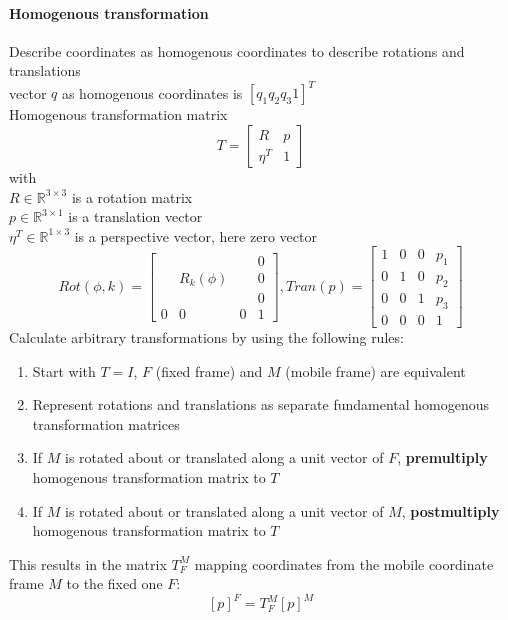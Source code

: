 \documentclass[12pt]{article}
\newcommand{\R}{\mathbb{R}}
\begin{document}
	\paragraph{Homogenous transformation} Describe coordinates as homogenous coordinates to describe rotations and translations\\
	vector $q$ as homogenous coordinates is $[q_{1} q_{2} q_{3} 1]^T$\\
	Homogenous transformation matrix
	\begin{equation}
	T = 
	\begin{bmatrix}
	R & p\\
	\eta^T & 1
	\end{bmatrix}
	\end{equation}
	with\\
	$R \in \R^{3 \times 3}$ is a rotation matrix\\
	$p \in \R^{3 \times 1}$ is a translation vector\\
	$\eta^T \in \R^{1 \times 3}$ is a perspective vector, here zero vector
	\begin{equation}
	Rot(\phi, k) = 
	\begin{bmatrix}
	& & & 0\\
	& R_{k}(\phi) & & 0\\
	& & & 0\\
	0 & 0 & 0 & 1
	\end{bmatrix}, 
	Tran(p) = 
	\begin{bmatrix}
	1 & 0 & 0 & p_{1}\\
	0 & 1 & 0 & p_{2}\\
	0 & 0 & 1 & p_{3}\\
	0 & 0 & 0 & 1
	\end{bmatrix}
	\end{equation}
	Calculate arbitrary transformations by using the following rules:
	\begin{enumerate}
		\item Start with $T = I$, $F$ (fixed frame) and $M$ (mobile frame) are equivalent
		\item Represent rotations and translations as separate fundamental homogenous transformation matrices
		\item If $M$ is rotated about or translated along a unit vector of $F$, \textbf{premultiply} homogenous transformation matrix to $T$
		\item If $M$ is rotated about or translated along a unit vector of $M$, \textbf{postmultiply} homogenous transformation matrix to $T$
	\end{enumerate}
	This results in the matrix $T_F^M$ mapping coordinates from the mobile coordinate frame $M$ to the fixed one $F$:
	$$[p]^F = T_F^M [p]^M$$
	
\end{document}
